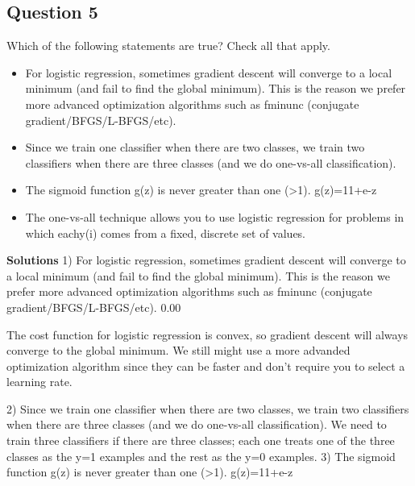 \documentclass[11pt]{article} %
\begin{document}



\subsection{Question 5}
Which of the following statements are true? Check all that apply.

\begin{itemize}
\item For logistic regression, sometimes gradient descent will converge to a local minimum (and fail to find the global minimum). This is the reason we prefer more advanced optimization algorithms such as fminunc (conjugate gradient/BFGS/L-BFGS/etc).

\item Since we train one classifier when there are two classes, we train two classifiers when there are three classes (and we do one-vs-all classification).

\item The sigmoid function g(z) is never greater than one (>1). g(z)=11+e-z

\item 
The one-vs-all technique allows you to use logistic regression for problems in which eachy(i) comes from a fixed, discrete set of values.
\end{itemize}






\textbf{Solutions}
1)
For logistic regression, sometimes gradient descent will converge to a local minimum (and fail to find the global minimum). This is the reason we prefer more advanced optimization algorithms such as fminunc (conjugate gradient/BFGS/L-BFGS/etc).  0.00

The cost function for logistic regression is convex, so gradient descent will always converge to the global minimum. We still might use a more advanded optimization algorithm since they can be faster and don't require you to select a learning rate. 

2)
Since we train one classifier when there are two classes, we train two classifiers when there are three classes (and we do one-vs-all classification).  
We need to train three classifiers if there are three classes; each one treats one of the three classes as the y=1 examples and the rest as the y=0 examples. 
3)
The sigmoid function g(z) is never greater than one (>1). g(z)=11+e-z  
\end{document}

